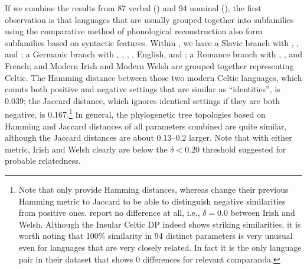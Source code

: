 \documentclass[output=paper,colorlinks,citecolor=brown]{langscibook}
\begin{document}
\noindent If we combine the results from 87 verbal (\citealt{mm:bakerroberts2024}) and 94 nominal  (\citealt{mm:ceolin_at_2021}), the first observation is that languages that are usually grouped together into subfamilies using the comparative method of phonological reconstruction also form subfamilies based on syntactic features. Within , we have a Slavic branch with , ,  and ; a Germanic branch with , , , , English,  and ; a Romance branch with , ,  and French; and Modern Irish and Modern Welsh are grouped together representing Celtic. The Hamming distance between those two modern Celtic languages, which counts both positive and negative settings that are similar as “identities”, is 0.039; the Jaccard distance, which ignores identical settings if they are both negative, is 0.167.\footnote{Note that \citet{mm:bakerroberts2024} only provide Hamming distances, whereas \citet{mm:ceolin_at_2021} change their previous Hamming metric to Jaccard to be able to distinguish negative similarities from positive ones. \citet{mm:ceolin_at_2021} report no difference at all, i.e., $\delta=0.0$ between Irish and Welsh. Although the Insular Celtic DP indeed shows striking similarities, it is worth noting that 100\% similarity in 94 distinct parameters is very unusual even for languages that are very closely related. In fact it is the only language pair in their dataset that shows 0 differences for relevant comparanda.} In general, the phylogenetic tree topologies based on Hamming and Jaccard distances of all parameters combined are quite similar, although the Jaccard distances are about 0.13--0.2 larger. Note that with either metric, Irish and Welsh clearly are below the $\delta<0.20$ threshold \citet{mm:bortolussi_how_2011} suggested for probable relatedness.
\end{document}
